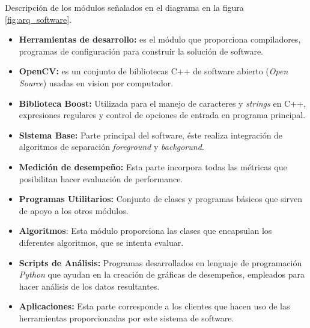Descripción de los módulos señalados en el diagrama en la figura \ref{fig:arq_software}.
\begin{itemize}
  \item \textbf{Herramientas de desarrollo:} es el módulo que proporciona compiladores, programas de configuración para construir la solución de software.
  \item \textbf{OpenCV:} es un conjunto de bibliotecas C++ de software abierto (\textit{Open Source}) usadas en vision por computador.
  \item \textbf{Biblioteca Boost:} Utilizada para el manejo de caracteres y \textit{strings} en C++, expresiones regulares y control de opciones de entrada en programa principal.
  \item \textbf{Sistema Base:} Parte principal del software, éste realiza integración de algoritmos de separación \textit{foreground} y \textit{backgorund}.
  \item \textbf{Medición de desempeño:} Esta parte incorpora todas las métricas que posibilitan hacer evaluación de performance.
  \item \textbf{Programas Utilitarios:} Conjunto de clases y programas básicos que sirven de apoyo a los otros módulos.   
  \item \textbf{Algoritmos}: Esta módulo proporciona las clases que encapsulan los diferentes algoritmos, que se intenta evaluar.
  \item \textbf{Scripts de Análisis:} Programas desarrollados en lenguaje de programación \textit{Python} que ayudan en la creación de gráficas de desempeños, empleados para hacer análisis de los datos resultantes.
  \item \textbf{Aplicaciones:} Esta parte corresponde a los clientes que hacen uso de las herramientas proporcionadas por este sistema de software. 
\end{itemize}

